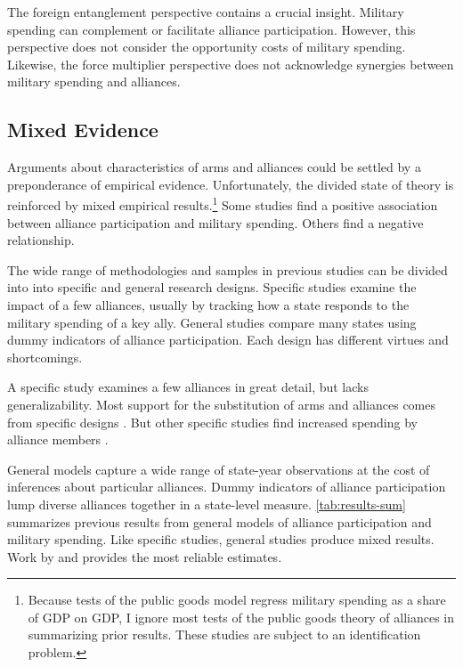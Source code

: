 \documentclass[12pt]{article}
\begin{document}
The foreign entanglement perspective contains a crucial insight.
Military spending can complement or facilitate alliance participation. 
However, this perspective does not consider the opportunity costs of military spending. 
Likewise, the force multiplier perspective does not acknowledge synergies between military spending and alliances. 


\subsection{Mixed Evidence} 


Arguments about characteristics of arms and alliances could be settled by a preponderance of empirical evidence. 
Unfortunately, the divided state of theory is reinforced by mixed empirical results.\footnote{Because tests of the public goods model regress military spending as a share of GDP on GDP, I ignore most tests of the public goods theory of alliances in summarizing prior results. These studies are subject to an identification problem.}
Some studies find a positive association between alliance participation and military spending. 
Others find a negative relationship. 


The wide range of methodologies and samples in previous studies can be divided into into specific and general research designs.  
Specific studies examine the impact of a few alliances, usually by tracking how a state responds to the military spending of a key ally. 
General studies compare many states using dummy indicators of alliance participation. 
Each design has different virtues and shortcomings. 


A specific study examines a few alliances in great detail, but lacks generalizability. 
Most support for the substitution of arms and alliances comes from specific designs \citep{BarnettLevy1991, Morrow1993, Sorokin1994, PluemperNeumayer2015}. 
But other specific studies find increased spending by alliance members \citep{ConybeareSandler1990, Chenetal1996}. 


General models capture a wide range of state-year observations at the cost of inferences about particular alliances. 
Dummy indicators of alliance participation lump diverse alliances together in a state-level measure. 
\autoref{tab:results-sum} summarizes previous results from general models of alliance participation and military spending. 
Like specific studies, general studies produce mixed results. 
Work by \citet{DigiuseppePoast2016} and \citet{Horowitzetal2017} provides the most reliable estimates. 
\end{document}
